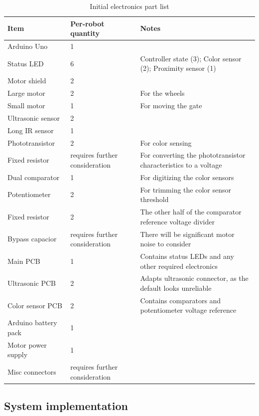 \begin{table}[H]\centering
{\renewcommand{\arraystretch}{1.5}
    \begin{tabulary}{\textwidth}{Lp{3cm}L}
        \toprule
        Item & Per-robot quantity & Notes \\
        \midrule
        Arduino Uno & 1 & \\
        Status LED & 6 & Controller state (3); Color sensor (2); Proximity
        sensor (1) \\
        Motor shield & 2 & \\
        Large motor & 2 & For the wheels \\
        Small motor & 1 & For moving the gate \\
        Ultrasonic sensor & 2 & \\
        Long IR sensor & 1 & \\
        Phototransistor & 2 & For color sensing \\
        Fixed resistor & requires further consideration & For converting the
        phototransistor characteristics to a voltage \\
        Dual comparator & 1 & For digitizing the color sensors \\
        Potentiometer & 2 & For trimming the color sensor
        threshold \\
        Fixed resistor & 2 & The other half of the comparator reference voltage
        divider \\
        Bypass capacior & requires further consideration & There will be
        significant motor noise to consider \\
        Main PCB & 1 & Contains status LEDs and any other required
        electronics \\
        Ultrasonic PCB & 2 & Adapts ultrasonic connector, as the default looks
        unreliable \\
        Color sensor PCB & 2 & Contains comparators and potentiometer voltage
        reference \\
        Arduino battery pack & 1 & \\
        Motor power supply & 1 & \\
        Misc connectors & requires further consideration & \\
        \bottomrule
    \end{tabulary}}
    \caption{Initial electronics part list}
    \label{tab:parts_list}
\end{table}


\subsection{System implementation}

